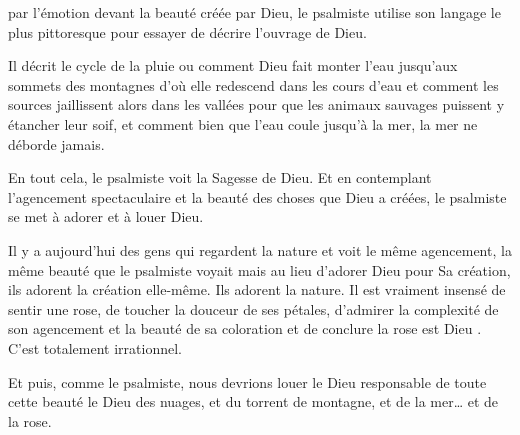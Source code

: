 



 par l'émotion devant la beauté créée par Dieu,
 le psalmiste utilise son langage le plus pittoresque pour essayer
 de décrire l'ouvrage de Dieu.

Il décrit le cycle de la pluie ou comment Dieu fait monter l'eau
 jusqu'aux sommets des montagnes d'où elle redescend dans les cours d'eau
 et comment les sources jaillissent alors dans les vallées pour que les animaux
 sauvages puissent y étancher leur soif, et comment bien que l'eau coule
 jusqu'à la mer, la mer ne déborde jamais.

En tout cela, le psalmiste voit la Sagesse de Dieu.
 Et en contemplant l'agencement spectaculaire et la beauté des choses que Dieu
 a créées, le psalmiste se met à adorer et à louer Dieu.

Il y a aujourd'hui des gens qui regardent la nature et voit le même agencement,
 la même beauté que le psalmiste voyait \ocadr{}mais au lieu d'adorer Dieu pour
 Sa création, ils adorent la création elle-même. Ils adorent la nature.
 Il est vraiment insensé de sentir une rose,
 de toucher la douceur de ses pétales, d'admirer la complexité de son agencement
 et la beauté de sa coloration et de conclure \og la rose est Dieu \fg{}.
 C'est totalement irrationnel. 


Et puis, comme le psalmiste, nous devrions louer le Dieu responsable
 de toute cette beauté \ocadr{}le Dieu des nuages, et du torrent de montagne,
 et de la mer\dots{} et de la rose. 

\dvrule





